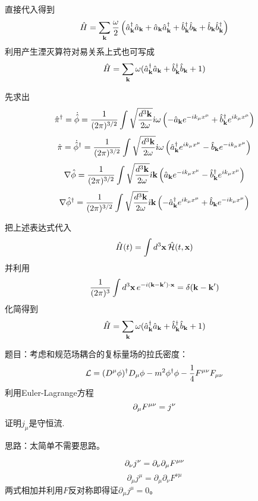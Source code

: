 \documentclass[CJK]{beamer}
\begin{document}
\begin{frame}
\bch
直接代入得到
$$\hat{H} = \sum_{{\mathbf{k}}} \frac{\omega}{2}\left({\hat{a}^\dagger}_{{\mathbf{k}}}{\hat{a}}_{{\mathbf{k}}} + {\hat{a}}_{{\mathbf{k}}}{\hat{a}^\dagger}_{{\mathbf{k}}} + {\hat{b}^\dagger}_{{\mathbf{k}}}{\hat{b}}_{{\mathbf{k}}} + {\hat{b}}_{{\mathbf{k}}}{\hat{b}^\dagger}_{{\mathbf{k}}}\right)$$ 
利用产生湮灭算符对易关系上式也可写成
$$\hat{H} = \sum_{{\mathbf{k}}} \omega({\hat{a}^\dagger}_{{\mathbf{k}}}{\hat{a}}_{{\mathbf{k}}} + {\hat{b}^\dagger}_{{\mathbf{k}}}{\hat{b}}_{{\mathbf{k}}} + 1)$$
\ech
\end{frame}



\begin{frame}
\bch
先求出
$${\hat{\pi}}^\dagger = \dot{{\hat{\phi}}} = \frac{1}{(2\pi)^{3/2}} \int \sqrt{\frac{d^3{\mathbf{k}}}{2\omega}} {\dot{\imath}} \omega \left(-{\hat{a}}_{{\mathbf{k}}} e^{-ik_\mu x^\mu} + {\hat{b}^\dagger}_{{\mathbf{k}}}e^{ik_\mu x^\mu}\right) $$
$${\hat{\pi}} = \dot{{\hat{\phi}}}^\dagger = \frac{1}{(2\pi)^{3/2}} \int \sqrt{\frac{d^3{\mathbf{k}}}{2\omega}} {\dot{\imath}} \omega \left({\hat{a}^\dagger}_{{\mathbf{k}}} e^{ik_\mu x^\mu} - {\hat{b}}_{{\mathbf{k}}}e^{-ik_\mu x^\mu}\right) $$
$$\nabla{\hat{\phi}} = \frac{1}{(2\pi)^{3/2}} \int \sqrt{\frac{d^3{\mathbf{k}}}{2\omega}} {\dot{\imath}}{\mathbf{k}} \left({\hat{a}}_{{\mathbf{k}}} e^{-ik_\mu x^\mu} - {\hat{b}^\dagger}_{{\mathbf{k}}}e^{ik_\mu x^\mu}\right) $$
$$\nabla{\hat{\phi}}^\dagger = \frac{1}{(2\pi)^{3/2}} \int \sqrt{\frac{d^3{\mathbf{k}}}{2\omega}} {\dot{\imath}} {\mathbf{k}} \left(-{\hat{a}^\dagger}_{{\mathbf{k}}} e^{ik_\mu x^\mu} + {\hat{b}}_{{\mathbf{k}}}e^{-ik_\mu x^\mu}\right) $$
\ech
\end{frame}

\begin{frame}
\bch
把上述表达式代入
$$\hat{H}(t) = \int d^3{\mathbf{x}}\, \hat{{\mathcal{H}}}(t, {\mathbf{x}})$$
并利用
$$\frac{1}{(2\pi)^3}\int d^3{\mathbf{x}}\, e^{-i({\mathbf{k}}-{\mathbf{k}}')\cdot{\mathbf{x}}} = \delta({\mathbf{k}} - {\mathbf{k}}')$$ 
化简得到
$$\hat{H} = \sum_{{\mathbf{k}}} \omega({\hat{a}^\dagger}_{{\mathbf{k}}}{\hat{a}}_{{\mathbf{k}}} + {\hat{b}^\dagger}_{{\mathbf{k}}}{\hat{b}}_{{\mathbf{k}}} + 1)$$
\ech
\end{frame}



\begin{frame}
\bch
题目：考虑和规范场耦合的复标量场的拉氏密度：
$${\mathcal{L}} = (D^\mu\phi)^\dagger D_\mu \phi - m^2\phi^\dagger \phi  - \frac{1}{4}{F^{\mu\nu}}{F_{\mu\nu}}$$
利用Euler-Lagrange方程
$$\partial_\mu {F^{\mu\nu}} = j^\nu$$
证明$j_\mu$是守恒流.

\skipline
思路：太简单不需要思路。
\ech
\end{frame}

\begin{frame}
\bch
$$\partial_\nu j^\nu = \partial_\nu \partial_\mu {F^{\mu\nu}}$$
$$\partial_\mu j^\mu = \partial_\mu \partial_\nu F^{\nu\mu}$$
两式相加并利用$F$反对称即得证$\partial_\mu j^\mu = 0$。
\ech
\end{frame}
\end{document}
